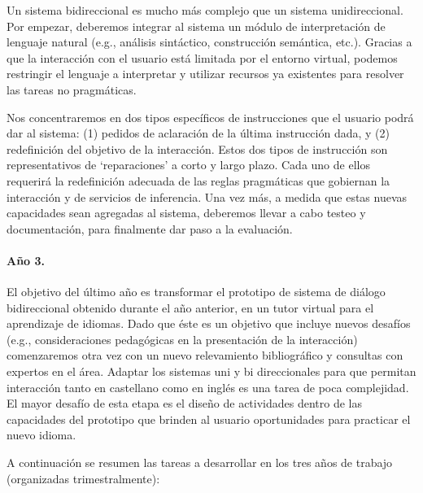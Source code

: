 Un sistema
bidireccional es mucho m\'as complejo que un sistema unidireccional.  Por
empezar, deberemos integrar al sistema un m\'odulo de interpretaci\'on de
lenguaje natural (e.g., an\'alisis sint\'actico, construcci\'on sem\'antica, etc.).
Gracias a que la interacci\'on con el usuario est\'a limitada por el entorno
virtual, podemos restringir el lenguaje a interpretar y utilizar recursos ya 
existentes para resolver las tareas no pragm\'aticas.

Nos concentraremos en dos tipos espec\'ificos de instrucciones que el usuario
podr\'a dar al sistema: (1) pedidos de aclaraci\'on de la \'ultima
instrucci\'on dada, y (2) redefinici\'on del objetivo de la interacci\'on.  Estos
dos tipos de instrucci\'on son representativos de `reparaciones' a corto y
largo plazo.  Cada uno de ellos requerir\'a la redefinici\'on adecuada de
las reglas pragm\'aticas que gobiernan la interacci\'on y de servicios
de inferencia.  Una vez m\'as, a medida que
estas nuevas capacidades sean agregadas al sistema, deberemos llevar a
cabo testeo y documentaci\'on, para finalmente dar paso a la evaluaci\'on.



\paragraph{A\~no 3.} El objetivo del \'ultimo a\~no es transformar el prototipo de sistema de di\'alogo bidireccional obtenido durante el a\~no anterior, en un tutor virtual para el aprendizaje de idiomas.  Dado que
\'este es un objetivo que incluye nuevos desaf\'ios (e.g., consideraciones
pedag\'ogicas en la presentaci\'on de la interacci\'on) comenzaremos otra
vez con un nuevo relevamiento bibliogr\'afico y consultas con expertos en
el \'area.  Adaptar los sistemas uni y bi direccionales para que permitan
interacci\'on tanto en castellano como en ingl\'es es una tarea de poca
complejidad.  El mayor desaf\'io de esta etapa es el dise\~no de
actividades dentro de las capacidades del prototipo que brinden al
usuario oportunidades para practicar el nuevo idioma.

\medskip

\noindent
A continuaci\'on se resumen las tareas a desarrollar en los tres a\~nos de
trabajo (organizadas trimestralmente):

